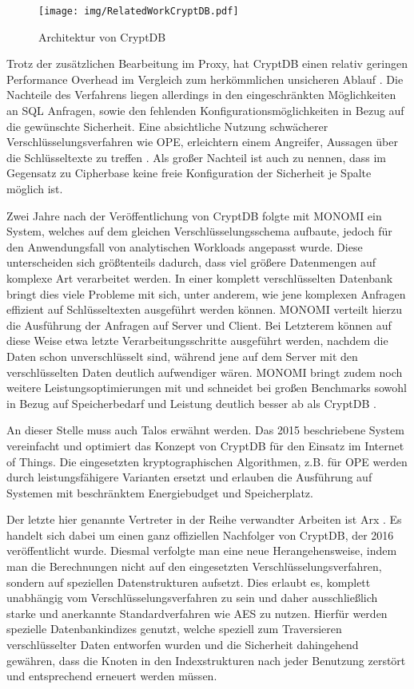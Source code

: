 \begin{figure}
	\texttt{[image: img/RelatedWorkCryptDB.pdf]}
	\centering
	\caption{Architektur von CryptDB}
	\label{fig:cryptdb}
\end{figure}

Trotz der zusätzlichen Bearbeitung im Proxy, hat CryptDB einen relativ geringen Performance Overhead im Vergleich zum herkömmlichen unsicheren Ablauf \cite{Popa2012}. Die Nachteile des Verfahrens liegen allerdings in den eingeschränkten Möglichkeiten an SQL Anfragen, sowie den fehlenden Konfigurationsmöglichkeiten in Bezug auf die gewünschte Sicherheit. Eine absichtliche Nutzung schwächerer Verschlüsselungsverfahren wie OPE, erleichtern einem Angreifer, Aussagen über die Schlüsseltexte zu treffen \cite{Poddar2016}. Als großer Nachteil ist auch zu nennen, dass im Gegensatz zu Cipherbase keine freie Konfiguration der Sicherheit je Spalte möglich ist.

Zwei Jahre nach der Veröffentlichung von CryptDB folgte mit MONOMI \cite{Tu2013} ein System, welches auf dem gleichen Verschlüsselungsschema aufbaute, jedoch für den Anwendungsfall von analytischen Workloads angepasst wurde. Diese unterscheiden sich größtenteils dadurch, dass viel größere Datenmengen auf komplexe Art verarbeitet werden. In einer komplett verschlüsselten Datenbank bringt dies viele Probleme mit sich, unter anderem, wie jene komplexen Anfragen effizient auf Schlüsseltexten ausgeführt werden können. MONOMI verteilt hierzu die Ausführung der Anfragen auf Server und Client. Bei Letzterem können auf diese Weise etwa letzte Verarbeitungsschritte ausgeführt werden, nachdem die Daten schon unverschlüsselt sind, während jene auf dem Server mit den verschlüsselten Daten deutlich aufwendiger wären. MONOMI bringt zudem noch weitere Leistungsoptimierungen mit und schneidet bei großen Benchmarks sowohl in Bezug auf Speicherbedarf und Leistung deutlich besser ab als CryptDB \cite{Tu2013}.

An dieser Stelle muss auch Talos \cite{Shafagh2015} erwähnt werden. Das 2015 beschriebene System vereinfacht und optimiert das Konzept von CryptDB für den Einsatz im Internet of Things. Die eingesetzten kryptographischen Algorithmen, z.B. für OPE werden durch leistungsfähigere Varianten ersetzt und erlauben die Ausführung auf Systemen mit beschränktem Energiebudget und Speicherplatz.

Der letzte hier genannte Vertreter in der Reihe verwandter Arbeiten ist Arx \cite{Poddar2016}. Es handelt sich dabei um einen ganz offiziellen Nachfolger von CryptDB, der 2016 veröffentlicht wurde. Diesmal verfolgte man eine neue Herangehensweise, indem man die Berechnungen nicht auf den eingesetzten Verschlüsselungsverfahren, sondern auf speziellen Datenstrukturen aufsetzt. Dies erlaubt es, komplett unabhängig vom Verschlüsselungsverfahren zu sein und daher ausschließlich starke und anerkannte Standardverfahren wie AES zu nutzen. Hierfür werden spezielle Datenbankindizes genutzt, welche speziell zum Traversieren verschlüsselter Daten entworfen wurden und die Sicherheit dahingehend gewähren, dass die Knoten in den Indexstrukturen nach jeder Benutzung zerstört und entsprechend erneuert werden müssen.

